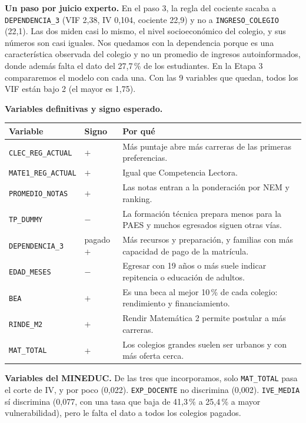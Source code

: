 \documentclass[11pt]{article}
\begin{document}
\textbf{Un paso por juicio experto.} En el paso 3, la regla del cociente
sacaba a \texttt{DEPENDENCIA\_3} (VIF 2,38, IV 0,104, cociente 22,9) y no
a \texttt{INGRESO\_COLEGIO} (22,1). Las dos miden casi lo mismo, el nivel
socioeconómico del colegio, y sus números son casi iguales. Nos quedamos
con la dependencia porque es una característica observada del colegio y
no un promedio de ingresos autoinformados, donde además falta el dato del
27,7\,\% de los estudiantes. En la Etapa 3 compararemos el modelo con cada
una. Con las 9 variables que quedan, todos los VIF están bajo 2 (el mayor
es 1,75).

\textbf{Variables definitivas y signo esperado.}

\begin{center}
\begin{tabular}{>{\raggedright\arraybackslash}p{4.2cm}
                >{\centering\arraybackslash}p{1.9cm}
                >{\raggedright\arraybackslash}p{7.3cm}}
\toprule
\textbf{Variable} & \textbf{Signo} & \textbf{Por qué} \\
\midrule
\texttt{CLEC\_REG\_ACTUAL}  & $+$ & Más puntaje abre más carreras de las primeras preferencias. \\
\texttt{MATE1\_REG\_ACTUAL} & $+$ & Igual que Competencia Lectora. \\
\texttt{PROMEDIO\_NOTAS}    & $+$ & Las notas entran a la ponderación por NEM y ranking. \\
\texttt{TP\_DUMMY}          & $-$ & La formación técnica prepara menos para la PAES y muchos egresados siguen otras vías. \\
\texttt{DEPENDENCIA\_3}     & pagado $+$ & Más recursos y preparación, y familias con más capacidad de pago de la matrícula. \\
\texttt{EDAD\_MESES}        & $-$ & Egresar con 19 años o más suele indicar repitencia o educación de adultos. \\
\texttt{BEA}                & $+$ & Es una beca al mejor 10\,\% de cada colegio: rendimiento y financiamiento. \\
\texttt{RINDE\_M2}          & $+$ & Rendir Matemática 2 permite postular a más carreras. \\
\texttt{MAT\_TOTAL}         & $+$ & Los colegios grandes suelen ser urbanos y con más oferta cerca. \\
\bottomrule
\end{tabular}
\end{center}

\textbf{Variables del MINEDUC.} De las tres que incorporamos, solo
\texttt{MAT\_TOTAL} pasa el corte de IV, y por poco (0,022).
\texttt{EXP\_DOCENTE} no discrimina (0,002). \texttt{IVE\_MEDIA} sí
discrimina (0,077, con una tasa que baja de 41,3\,\% a 25,4\,\% a mayor
vulnerabilidad), pero le falta el dato a todos los colegios pagados.
\end{document}
